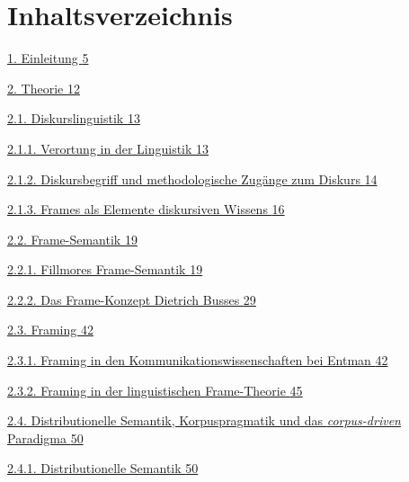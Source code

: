 \chapter{Inhaltsverzeichnis}\label{inhaltsverzeichnis}

\hyperref[einleitung]{1. Einleitung \hyperref[einleitung]{5}}

\hyperref[theorie]{2. Theorie \hyperref[theorie]{12}}

\hyperref[diskurslinguistik]{2.1. Diskurslinguistik \hyperref[diskurslinguistik]{13}}

\hyperref[verortung-in-der-linguistik]{2.1.1. Verortung in der Linguistik \hyperref[verortung-in-der-linguistik]{13}}

\hyperref[diskursbegriff-und-methodologische-zuguxe4nge-zum-diskurs]{2.1.2. Diskursbegriff und methodologische Zugänge zum Diskurs \hyperref[diskursbegriff-und-methodologische-zuguxe4nge-zum-diskurs]{14}}

\hyperref[frames-als-elemente-diskursiven-wissens]{2.1.3. Frames als Elemente diskursiven Wissens \hyperref[frames-als-elemente-diskursiven-wissens]{16}}

\hyperref[frame-semantik]{2.2. Frame-Semantik \hyperref[frame-semantik]{19}}

\hyperref[fillmores-frame-semantik]{2.2.1. Fillmores Frame-Semantik \hyperref[fillmores-frame-semantik]{19}}

\hyperref[das-frame-konzept-dietrich-busses]{2.2.2. Das Frame-Konzept Dietrich Busses \hyperref[das-frame-konzept-dietrich-busses]{29}}

\hyperref[framing]{2.3. Framing \hyperref[framing]{42}}

\hyperref[framing-in-den-kommunikationswissenschaften-bei-entman]{2.3.1. Framing in den Kommunikationswissenschaften bei Entman \hyperref[framing-in-den-kommunikationswissenschaften-bei-entman]{42}}

\hyperref[framing-in-der-linguistischen-frame-theorie]{2.3.2. Framing in der linguistischen Frame-Theorie \hyperref[framing-in-der-linguistischen-frame-theorie]{45}}

\hyperref[distributionelle-semantik-korpuspragmatik-und-das-corpus-driven-paradigma]{2.4. Distributionelle Semantik, Korpuspragmatik und das \emph{corpus-driven} Paradigma \hyperref[distributionelle-semantik-korpuspragmatik-und-das-corpus-driven-paradigma]{50}}

\hyperref[distributionelle-semantik]{2.4.1. Distributionelle Semantik \hyperref[distributionelle-semantik]{50}}

